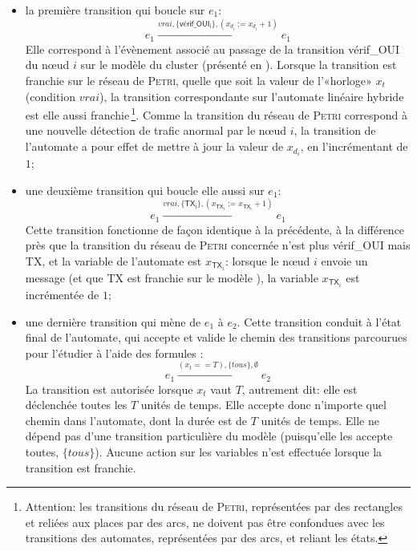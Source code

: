 \begin{itemize}
    \item la première transition qui boucle sur $e_1$:
        \[e_1\xrightarrow{\mathit{vrai},\{\mathsf{vérif\_OUI_i}\},(x_{d_i}:=x_{d_i}+1)}{e_1}\]
        Elle correspond à l'évènement associé au passage de la transition \textsf{vérif\_OUI} du nœud $i$ sur le modèle \rpsge du cluster (présenté en ).
        Lorsque la transition est franchie sur le réseau de \textsc{Petri}, quelle que soit la valeur de l'«horloge» $x_t$ (condition $\mathit{vrai}$), la transition correspondante sur l'automate linéaire hybride est elle aussi franchie\,\footnote{Attention: les transitions du réseau de \textsc{Petri}, représentées par des rectangles et reliées aux places par des arcs, ne doivent pas être confondues avec les transitions des automates, représentées par des arcs, et reliant les états.}.
        Comme la transition du réseau de \textsc{Petri} correspond à une nouvelle détection de trafic anormal par le nœud $i$, la transition de l'automate a pour effet de mettre à jour la valeur de $x_{d_i}$, en l'incrémentant de $1$;
    \item une deuxième transition qui boucle elle aussi sur $e_1$:
        \[e_1\xrightarrow{\mathit{vrai},\{\mathsf{TX_i}\},(x_{\mathsf{TX}_i}:=x_{\mathsf{TX}_i}+1)}{e_1}\]
        Cette transition fonctionne de façon identique à la précédente, à la différence près que la transition du réseau de \textsc{Petri} concernée n'est plus \textsf{vérif\_OUI} mais \textsf{TX}, et la variable de l'automate est $x_{\mathsf{TX}_i}$: lorsque le nœud $i$ envoie un message (et que \textsf{TX} est franchie sur le modèle \rpsge), la variable $x_{\mathsf{TX}_i}$ est incrémentée de $1$;
    \item une dernière transition qui mène de $e_1$ à $e_2$.
        Cette transition conduit à l'état final de l'automate, qui accepte et valide le chemin des transitions parcourues pour l'étudier à l'aide des formules \lsah:
        \[e_1\xrightarrow{(x_t==T),\{\mathit{tous}\},\emptyset}{e_2}\]
        La transition est autorisée lorsque $x_t$ vaut $T$, autrement dit: elle est déclenchée toutes les $T$ unités de temps.
        Elle accepte donc n'importe quel chemin dans l'automate, dont la durée est de $T$ unités de temps.
        Elle ne dépend pas d'une transition particulière du modèle \rpsge (puisqu'elle les accepte toutes, $\{\mathit{tous}\}$).
        Aucune action sur les variables n'est effectuée lorsque la transition est franchie.
\end{itemize}

